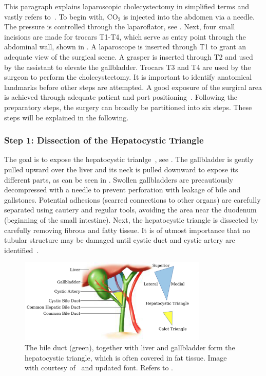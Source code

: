 This paragraph explains laparoscopic cholecystectomy in simplified terms and vastly refers to~\cite{ALES5766}. To begin with, $\text{CO}_2$ is injected into the abdomen via a needle. The pressure is controlled through the laparoflator, see . Next, four small incisions are made for trocars T1-T4, which serve as entry point through the abdominal wall, shown in . A laparoscope is inserted through T1 to grant an adequate view of the surgical scene. A grasper is inserted through T2 and used by the assistant to elevate the gallbladder. Trocars T3 and T4 are used by the surgeon to perform the cholecystectomy. It is important to identify anatomical landmarks before other steps are attempted. A good exposure of the surgical area is achieved through adequate patient and port positioning~\cite{gupta2023achieve}. Following the preparatory steps, the surgery can broadly be partitioned into six steps. These steps will be explained in the following.

\subsubsection{Step 1: Dissection of the Hepatocystic Triangle}
The goal is to expose the hepatocystic trianlge~\cite{mischinger2020critical}, see . The gallbladder is gently pulled upward over the liver and its neck is pulled downward to expose its different parts, as can be seen in . Swollen gallbladders are precautiously decompressed with a needle to prevent perforation with leakage of bile and gallstones. Potential adhesions (scarred connections to other organs) are carefully separated using cautery and regular tools, avoiding the area near the duodenum (beginning of the small intestine). Next, the hepatocystic triangle is dissected by carefully removing fibrous and fatty tissue. It is of utmost importance that no tubular structure may be damaged until cystic duct and cystic artery are identified~\cite{mischinger2020critical}.
\begin{figure}[tb]
    \centering
    \includegraphics[width=0.8\textwidth]{introduction/fig/24_02_03_hepatocystic_triangle.jpg}
    \caption{The bile duct (green), together with liver and gallbladder form the hepatocystic triangle, which is often covered in fat tissue. Image with courtesy of~\cite{mischinger2020critical} and updated font. Refers to .}
    \label{in:fig:hepatocystic_triangle}
\end{figure}

